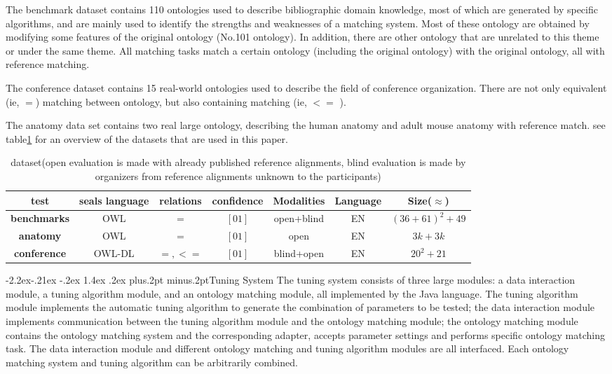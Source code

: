 \documentclass[twoside]{article}
\makeatletter
\def\subsubsection{\@startsection{subsubsection}{3}{\z@}%
 {-2.2ex\@plus -.21ex \@minus -.2ex}%
 {1.4ex \@plus.2ex}
{\normalfont\normalsize\protect\baselineskip=12pt plus.2pt minus.2pt\sl}}
\makeatother
\begin{document}
The benchmark dataset contains 110 ontologies used to describe bibliographic domain knowledge, most of which are generated by specific algorithms, and are mainly used to identify the strengths and weaknesses of a matching system. Most of these ontology are obtained by modifying some features of the original ontology (No.101 ontology). In addition, there are other ontology that are unrelated to this theme or under the same theme.
All matching tasks match a certain ontology (including the original ontology) with the original ontology, all with reference matching.

The conference dataset contains 15 real-world ontologies used to describe the field of conference organization. There are not only equivalent (ie, $=$) matching between ontology, but also containing matching (ie, $<=$ ).

The anatomy data set contains two real large ontology, describing the human anatomy and adult mouse anatomy with reference match.
see table\ref{table:dataset} for an overview of the datasets that are used in this paper.

\begin{table}[ht]
\centering
\caption{dataset(open evaluation is made with already published reference alignments, blind evaluation is made by organizers from reference alignments unknown to the
participants)}
\label{table:dataset}
\begin{tabular}{@{}ccccccc@{}}
\toprule
test				& seals language	& relations	 	& confidence	& Modalities	& Language	& Size($\approx$)		\\ \midrule
{\bf benchmarks}	& OWL				& $=$		 	& $[0 1]$		& open+blind	& EN		& $(36+61)^2+49$	\\
{\bf anatomy}		& OWL				& $=$		 	& $[0 1]$		& open			& EN		& $3k+3k$			\\
{\bf conference}	& OWL-DL			& $=,<=$	 	& $[0 1]$		& blind+open	& EN		& $20^2+21$		\\ \bottomrule
\end{tabular}
\end{table}


\subsubsection{Tuning System}
The tuning system consists of three large modules: a data interaction module, a tuning algorithm module, and an ontology matching module, all implemented by the Java language.
The tuning algorithm module implements the automatic tuning algorithm to generate the combination of parameters to be tested; the data interaction module implements communication between the tuning algorithm module and the ontology matching module; the ontology matching module contains the ontology matching system and the corresponding adapter, accepts parameter settings and performs specific ontology matching task.
The data interaction module and different ontology matching and tuning algorithm modules are all interfaced. Each ontology matching system and tuning algorithm can be arbitrarily combined.
\end{document}
